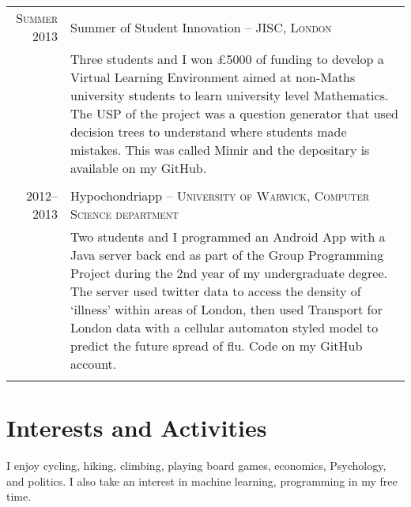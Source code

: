 \documentclass[a4paper,10pt]{article}
\begin{document}
\begin{tabular}{r|p{15.3cm}}
	\textsc{Summer 2013} & Summer of Student Innovation -- \textsc{JISC, London} \\&\footnotesize{Three students and I won £5000 of funding to develop a Virtual Learning Environment aimed at non-Maths university students to learn university level Mathematics. The USP of the project was a question generator that used decision trees to understand where students made mistakes. This was called Mimir and the depositary is available on my GitHub.}\\\multicolumn{2}{c}{} \\
	\textsc{2012--2013} & Hypochondriapp -- \textsc{University of Warwick, Computer Science department} \\&\footnotesize{Two students and I programmed an Android App with a Java server back end as part of the Group Programming Project during the 2nd year of my undergraduate degree. The server used twitter data to access the density of `illness' within areas of London, then used Transport for London data with a cellular automaton styled model to predict the future spread of flu. Code on my GitHub account.}\\\multicolumn{2}{c}{} \\
\end{tabular}

\section{Interests and Activities}
I enjoy cycling, hiking, climbing, playing board games, economics, Psychology, and politics. I also take an interest in machine learning, programming in my free time.\\
%
%
\bigskip
\bigskip
\bigskip


\end{document}
